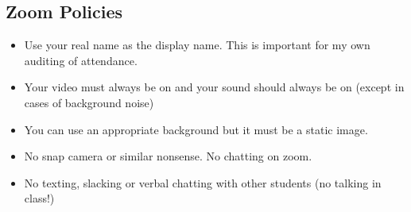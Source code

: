 \subsection*{Zoom Policies}

\begin{itemize}
\item Use your real name as the display name. This is important for my own auditing of attendance.
\item Your video must always be on and your sound should always be on (except in cases of background noise)
\item You can use an appropriate background but it must be a static image. 
\item No snap camera or similar nonsense. No chatting on zoom.
\item No texting, slacking or verbal chatting with other students (no talking in class!)
\end{itemize}